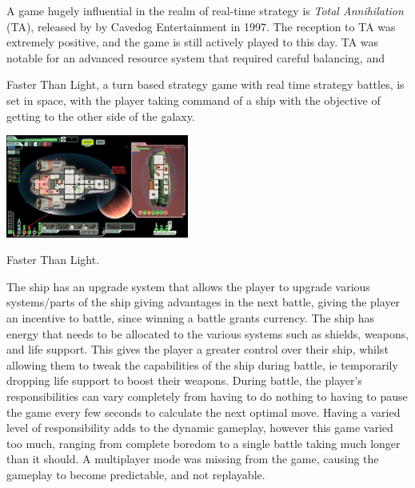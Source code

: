 A game hugely influential in the realm of real-time strategy is \emph{Total Annihilation} (TA), released by by Cavedog Entertainment in 1997. The reception to TA was extremely positive, and the game is still actively played to this day. TA was notable for an advanced resource system that required careful balancing, and 



Faster Than Light, a turn based strategy game with real time strategy battles, is set in space, with the player taking command of a ship with the objective of getting to the other side of the galaxy.
\begin{marginfigure}
	\includegraphics[width=6cm]{res/ftl/ftl}
	\caption{Faster Than Light.}
	\label{fig:doom}
\end{marginfigure}
The ship has an upgrade system that allows the player to upgrade various systems/parts of the ship giving advantages in the next battle, giving the player an incentive to battle, since winning a battle grants currency.
The ship has energy that needs to be allocated to the various systems such as shields, weapons, and life support.
This gives the player a greater control over their ship, whilst allowing them to tweak the capabilities of the ship during battle, ie temporarily dropping life support to boost their weapons.
During battle, the player's responsibilities can vary completely from having to do nothing to having to pause the game every few seconds to calculate the next optimal move. Having a varied level of responsibility adds to the dynamic gameplay, however this game varied too much, ranging from complete boredom to a single battle taking much longer than it should.
A multiplayer mode was missing from the game, causing the gameplay to become predictable, and not replayable.

